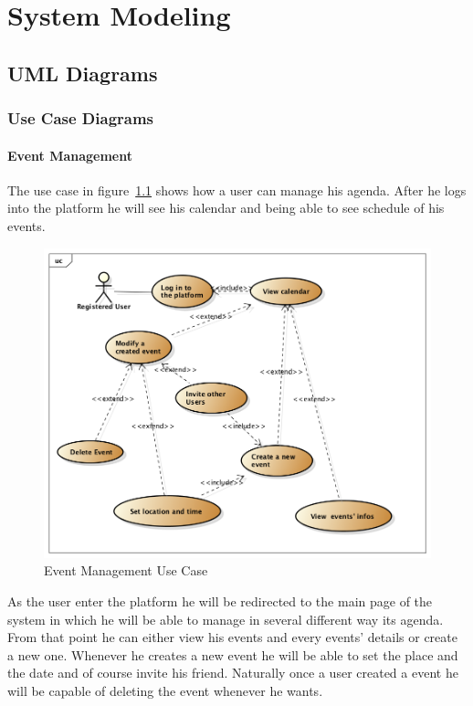 \chapter{System Modeling} \label{cap:cap4}
\section{UML Diagrams}
\subsection{Use Case Diagrams}
\subsubsection{Event Management}
The use case in figure~\ref{fig:eventusecase} shows how a user can manage his agenda. After he logs into the platform he will see his calendar and being able to see schedule of his events. 
 \begin{center}
 \begin{figure}[H]
    \includegraphics[width=1\textwidth]{../UMLDiagram/use_case/EventManagmentUseCase/EventManagment.png}
    \caption{Event Management Use Case}
     \label{fig:eventusecase}
     \end{figure}
   \end{center}  
As the user enter the platform he will be redirected to the main page of the system in which he will be able to manage in several different way its agenda. From that point he can either view his events and every events' details or create a new one. Whenever he creates a new event he will be able to set the place and the date and of course invite his friend. Naturally once a user created a event he will be capable of deleting the event whenever he wants.
